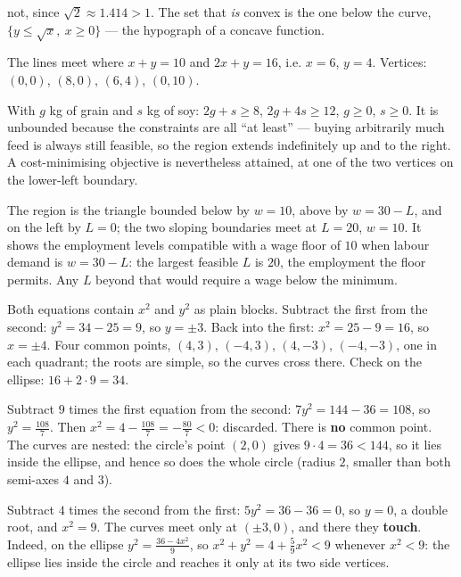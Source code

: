 \begin{solutions}
        not, since $\sqrt2\approx1.414>1$. The set that \emph{is} convex is
        the one below the curve, $\{y\le\sqrt{x},\ x\ge0\}$ --- the
        hypograph of a concave function.
  \item The lines meet where $x+y=10$ and $2x+y=16$, i.e. $x=6$, $y=4$.
        Vertices: $(0,0)$, $(8,0)$, $(6,4)$, $(0,10)$.
  \item With $g$ kg of grain and $s$ kg of soy: $2g+s\ge8$,
        $2g+4s\ge12$, $g\ge0$, $s\ge0$. It is unbounded because the
        constraints are all ``at least'' --- buying arbitrarily much feed is
        always still feasible, so the region extends indefinitely up and to
        the right. A cost-minimising objective is nevertheless attained,
        at one of the two vertices on the lower-left boundary.
  \item The region is the triangle bounded below by $w=10$, above by
        $w=30-L$, and on the left by $L=0$; the two sloping boundaries
        meet at $L=20$, $w=10$. It shows the employment levels compatible
        with a wage floor of $10$ when labour demand is $w=30-L$: the
        largest feasible $L$ is $20$, the employment the floor permits.
        Any $L$ beyond that would require a wage below the minimum.
  \item Both equations contain $x^{2}$ and $y^{2}$ as plain blocks.
        Subtract the first from the second: $y^{2}=34-25=9$, so $y=\pm3$.
        Back into the first: $x^{2}=25-9=16$, so $x=\pm4$. Four common
        points, $(4,3)$, $(-4,3)$, $(4,-3)$, $(-4,-3)$, one in each
        quadrant; the roots are simple, so the curves cross there. Check
        on the ellipse: $16+2\cdot9=34$. \checkmark
  \item Subtract $9$ times the first equation from the second:
        $7y^{2}=144-36=108$, so $y^{2}=\tfrac{108}{7}$. Then
        $x^{2}=4-\tfrac{108}{7}=-\tfrac{80}{7}<0$: discarded. There is
        \textbf{no} common point. The curves are nested: the circle's point
        $(2,0)$ gives $9\cdot4=36<144$, so it lies inside the ellipse, and
        hence so does the whole circle (radius $2$, smaller than both
        semi-axes $4$ and $3$).
  \item Subtract $4$ times the second from the first: $5y^{2}=36-36=0$, so
        $y=0$, a double root, and $x^{2}=9$. The curves meet only at
        $(\pm3,0)$, and there they \textbf{touch}. Indeed, on the ellipse
        $y^{2}=\tfrac{36-4x^{2}}{9}$, so
        $x^{2}+y^{2}=4+\tfrac59x^{2}<9$ whenever $x^{2}<9$: the ellipse lies
        inside the circle and reaches it only at its two side vertices.

\end{solutions}

